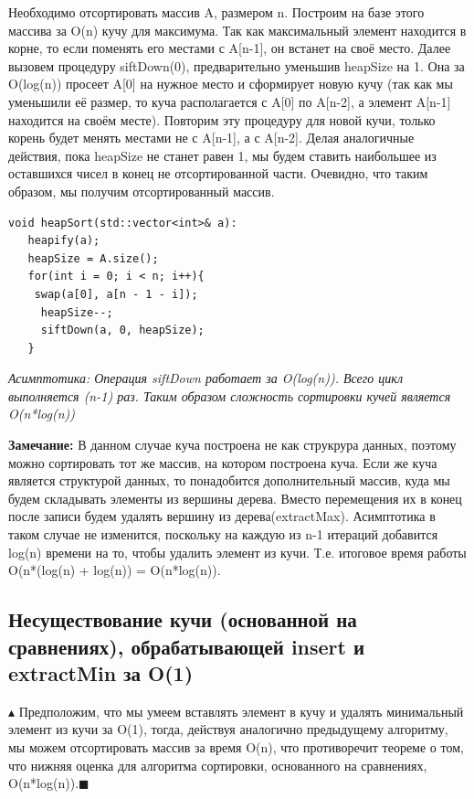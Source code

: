 Необходимо отсортировать массив A, размером n. Построим на базе этого массива за O(n) кучу для максимума. Так как максимальный элемент находится в корне, то если поменять его местами с A[n-1], он встанет на своё место. Далее вызовем процедуру siftDown(0), предварительно уменьшив heapSize на 1. Она за O(log(n)) просеет A[0] на нужное место и сформирует новую кучу (так как мы уменьшили её размер, то куча располагается с A[0] по A[n-2], а элемент A[n-1] находится на своём месте). Повторим эту процедуру для новой кучи, только корень будет менять местами не с A[n-1], а с A[n-2]. Делая аналогичные действия, пока heapSize не станет равен 1, мы будем ставить наибольшее из оставшихся чисел в конец не отсортированной части. Очевидно, что таким образом, мы получим отсортированный массив.

\begin{lstlisting}
void heapSort(std::vector<int>& a):
   heapify(a);
   heapSize = A.size();
   for(int i = 0; i < n; i++){
    swap(a[0], a[n - 1 - i]);
     heapSize--;
     siftDown(a, 0, heapSize);
   } 
\end{lstlisting}

\textit{Асимптотика: Операция siftDown работает за O(log(n)). Всего цикл выполняется (n-1) раз. Таким образом сложность сортировки кучей является O(n*log(n))}

\textbf{Замечание:} В данном случае куча построена не как струкрура данных, поэтому можно сортировать тот же массив, на котором построена куча. Если же куча является структурой данных, то понадобится дополнительный массив, куда мы будем складывать элементы из вершины дерева. Вместо перемещения их в конец после записи будем  удалять вершину из дерева(extractMax). Асимптотика в таком случае не изменится, поскольку на каждую из n-1  итераций добавится log(n) времени на то, чтобы удалить элемент из кучи. Т.е. итоговое время работы O(n*(log(n) + log(n)) = O(n*log(n)).
\subsection*{Несуществование кучи (основанной на сравнениях), обрабатывающей insert и extractMin за O(1)}

$\blacktriangle$ Предположим, что мы умеем вставлять элемент в кучу и удалять минимальный элемент из кучи за O(1), тогда, действуя аналогично предыдущему алгоритму, мы можем отсортировать массив за время O(n), что противоречит теореме о том, что нижняя оценка для алгоритма сортировки, основанного на сравнениях, O(n*log(n)).$\blacksquare$


